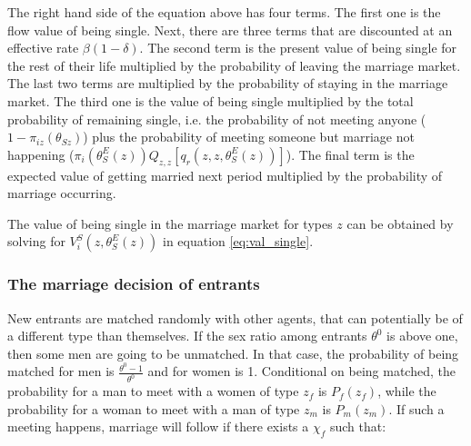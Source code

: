 \documentclass[12pt]{article}
\begin{document}
The right hand side of the equation above has four terms. The first one is the flow value of being single. Next, there are three terms that are discounted at an effective rate $\beta\left(1-\delta\right)$. The second term is the present value of being single for the rest of their life multiplied by the probability of leaving the marriage market. The last two terms are multiplied by the probability of staying in the marriage market. The third one is the value of being single multiplied by the total probability of remaining single, i.e. the probability of not meeting anyone ($1-\pi_{iz}\left(\theta_{Sz}\right)$) plus the probability of meeting someone but marriage not happening ($\pi_{i}\left(\theta_{S}^E(z)\right)Q_{z,z}\left[q_r\left(z,z,\theta_{S}^E(z)\right)\right]$). The final term is the expected value of getting married next period multiplied by the probability of marriage occurring.

The value of being single in the marriage market for types $z$ can be obtained by solving for $V_i^S\left(z,\theta_{S}^E(z)\right)$ in equation \ref{eq:val_single}.


\subsubsection{The marriage decision of entrants}

New entrants are matched randomly with other agents, that can potentially be of a different type than themselves. If the sex ratio among entrants $\theta^0$ is above one, then some men are going to be unmatched. In that case, the probability of being matched for men is $\frac{\theta^0 -1}{\theta^0}$ and for women is 1. Conditional on being matched, the probability for a man to meet with a women of type $z_f$ is $P_f\left(z_f\right)$, while the probability for a woman to meet with a man of type $z_m$ is $P_m(z_m)$. If such a meeting happens, marriage will follow if there exists a $\chi_f$ such that:
\end{document}
